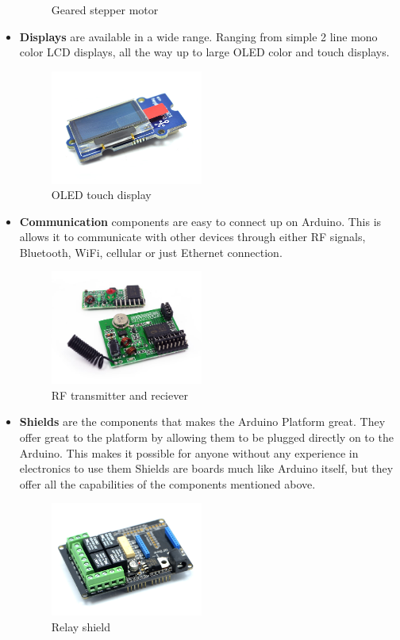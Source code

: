 \begin{itemize}
\begin{figure}[H]
\caption{Geared stepper motor}
\end{figure}
\item[] \textbf{Displays} are available in a wide range. Ranging from simple 2 line mono color LCD displays, all the way up to large OLED color and touch displays. 
\begin{figure}[H]
\centering
\includegraphics[width=5cm]{billeder/display.jpg}
\caption{OLED touch display}
\end{figure}
\item[] \textbf{Communication} components are easy to connect up on Arduino. This is allows it to communicate with other devices through either RF signals, Bluetooth, WiFi, cellular or just Ethernet connection.
\begin{figure}[H]
\centering
\includegraphics[width=5cm]{billeder/com.jpg}
\caption{RF transmitter and reciever}
\end{figure}
\item[] \textbf{Shields} are the components that makes the Arduino Platform great. They offer great  to the platform by allowing them to be plugged directly on to the Arduino. This makes it possible for anyone without any experience in electronics  to use them Shields are boards much like Arduino itself, but they offer all the capabilities of the components mentioned above.
\begin{figure}[H]
\centering
\includegraphics[width=5cm]{billeder/Shield.jpg}
\caption{Relay shield}
\end{figure}

\end{itemize}


